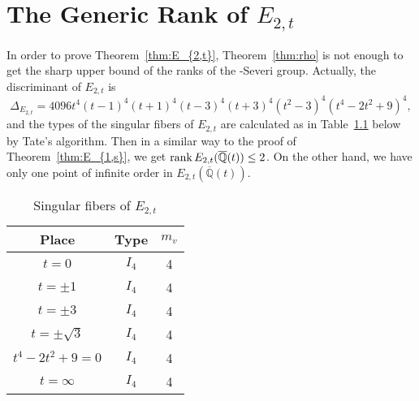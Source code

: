 \documentclass[main]{subfiles}
\begin{document}
\chapter{The Generic Rank of $E_{2,t}$}

In order to prove Theorem~\ref{thm:E_{2,t}}, Theorem~\ref{thm:rho} is not enough to get the sharp upper bound of the ranks of the \Neron-Severi group.
Actually, the discriminant of $E_{2,t}$ is 
\begin{equation}
    \Delta_{E_{2,t}} = 4096t^{4}(t - 1)^{4}(t + 1)^{4}(t - 3)^{4}(t + 3)^{4}(t^{2} - 3)^{4}(t^{4} - 2t^{2} + 9)^{4},
\end{equation}
and the types of the singular fibers of $E_{2,t}$ are calculated as in Table~\ref{tab:E_{2,t}} below by Tate's algorithm.
Then in a similar way to the proof of Theorem~\ref{thm:E_{1,s}}, we get $\operatorname{rank} E_{2,t}(\overline{\mathbb{Q}}(t)) \leq 2$.
On the other hand, we have only one point of infinite order in $E_{2,t}(\overline{\mathbb{Q}}(t))$.
\begin{table}[h]
    \centering
    \caption{Singular fibers of $E_{2,t}$}
    \begin{tabular}{|c|c|c|}
        \hline
        Place            & Type  & $m_v$ \\
        \hline
        $t=0$            & $I_4$ & 4     \\
        $t=\pm 1$        & $I_4$ & 4     \\
        $t=\pm 3$        & $I_4$ & 4     \\
        $t=\pm \sqrt{3}$ & $I_4$ & 4     \\
        $t^4-2t^2+9=0$   & $I_4$ & 4     \\
        $t=\infty$       & $I_4$ & 4     \\
        \hline
    \end{tabular}
    \label{tab:E_{2,t}}
\end{table}

\end{document}
